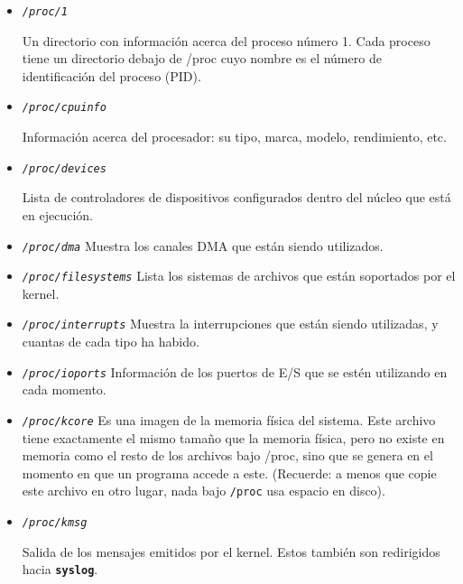 	\begin{itemize} 
	
	\item

	\textit{\texttt{/proc/1}}

	 Un directorio con información acerca del proceso número
	1. 	Cada proceso tiene un directorio debajo de /proc cuyo nombre es
	el número de identificación del proceso (PID).  
	
	
	\item
	
	\textit{\texttt{/proc/cpuinfo}}
	
	 Información acerca del procesador: su tipo, marca,
	modelo, 	rendimiento, etc.  
	
	
	\item
	
	\textit{\texttt{/proc/devices}}
	
	 Lista de controladores de dispositivos configurados
	dentro 	del núcleo que está en ejecución.
	
	
	\item \textit{\texttt{/proc/dma}}
	 Muestra los canales DMA que están siendo utilizados.
	
	
	\item
	\textit{\texttt{/proc/filesystems}}
	 Lista los sistemas de archivos que están soportados por
	el kernel.  
	
	\item
	\textit{\texttt{/proc/interrupts}}
	 Muestra la interrupciones que están siendo utilizadas, y
	cuantas de cada tipo ha habido.  
	
	\item \textit{\texttt{/proc/ioports}}
	 Información de los puertos de E/S que se estén
	utilizando 	en cada momento.  
	
	\item \textit{\texttt{/proc/kcore}}
	 Es una imagen de la memoria física del sistema. Este
	archivo tiene exactamente el mismo tamaño que la memoria física, pero no
	existe en memoria como el resto de los archivos bajo /proc, sino que se
	genera en el momento en que un programa accede a este. (Recuerde: a
	menos que copie este archivo en otro lugar, nada bajo
	\texttt{/proc} usa espacio en disco).
	
	
	\item
	
	\textit{\texttt{/proc/kmsg}}
	
	 Salida de los mensajes emitidos por el kernel. Estos
	también son redirigidos hacia \texttt{\textbf{syslog}}.
		

\end{itemize}
